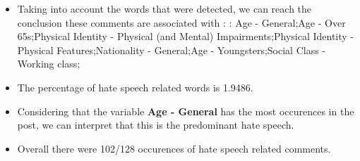 \documentclass[11pt]{article}
\begin{document}
\begin{itemize}\item Taking into account the words that were detected, we can reach the conclusion these comments are associated with : : Age - General;Age - Over 65s;Physical Identity - Physical (and Mental) Impairments;Physical Identity - Physical Features;Nationality - General;Age - Youngsters;Social Class - Working class;%

\item The percentage of hate speech related words is 1.9486.

\item Considering that the variable \textbf{Age - General} has the most occurences in the post, we can interpret that this is the predominant hate speech.

\item Overall there were 102/128 occurences of hate speech related comments.\end{itemize}
\end{document}
